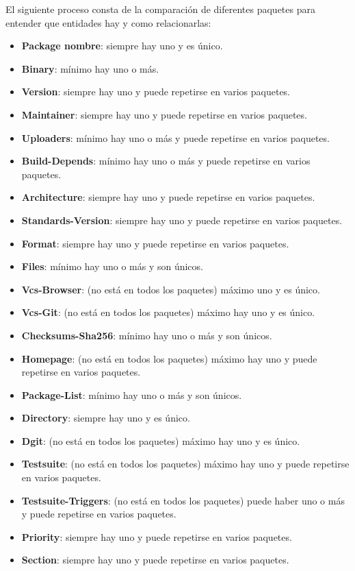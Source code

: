 \documentclass[a4paper, 12pt]{book}
\begin{document}
El siguiente proceso consta de la comparación de diferentes paquetes para entender que entidades hay y como relacionarlas:

\begin{itemize}
	\item \textbf {Package nombre}: siempre hay uno y es único. 
	\item \textbf {Binary}: mínimo hay uno o más. 
	\item \textbf {Version}: siempre hay uno y puede repetirse en varios paquetes.
	\item \textbf {Maintainer}: siempre hay uno y puede repetirse en varios paquetes. 
	\item \textbf {Uploaders}: mínimo hay uno o más y puede repetirse en varios paquetes. 
	\item \textbf {Build-Depends}: mínimo hay uno o más y puede repetirse en varios paquetes.  
	\item \textbf {Architecture}: siempre hay uno y puede repetirse en varios paquetes. 
	\item \textbf {Standards-Version}: siempre hay uno y puede repetirse en varios paquetes.
	\item \textbf {Format}: siempre hay uno y puede repetirse en varios paquetes. 
	\item \textbf {Files}:  mínimo hay uno o más y son únicos. 
	\item \textbf {Vcs-Browser}: (no está en todos los paquetes) máximo uno y es único. 
	\item \textbf {Vcs-Git}: (no está en todos los paquetes) máximo hay uno y es único. 
	\item \textbf {Checksums-Sha256}: mínimo hay uno o más y son únicos. 
	\item \textbf {Homepage}: (no está en todos los paquetes) máximo hay uno y puede repetirse en varios paquetes. 
	\item \textbf {Package-List}: mínimo hay uno o más y son únicos. 
	\item \textbf {Directory}: siempre hay uno y es único. 
	\item \textbf {Dgit}: (no está en todos los paquetes) máximo hay uno y es único. 
	\item \textbf {Testsuite}: (no está en todos los paquetes) máximo hay uno y puede repetirse en varios paquetes. 
	\item \textbf {Testsuite-Triggers}: (no está en todos los paquetes) puede haber uno o más y puede repetirse en varios paquetes. 
	\item \textbf {Priority}: siempre hay uno y puede repetirse en varios paquetes. 
	\item \textbf {Section}: siempre hay uno y puede repetirse en varios paquetes. 
\end{itemize}
\end{document}
